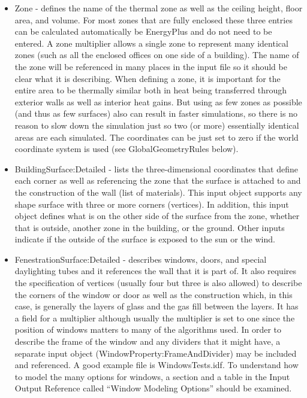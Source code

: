 \begin{itemize}
\item Zone - defines the name of the thermal zone as well as the ceiling
height, floor area, and volume. For most zones that are fully enclosed
these three entries can be calculated automatically be EnergyPlus
and do not need to be entered. A zone multiplier allows a single zone
to represent many identical zones (such as all the enclosed offices
on one side of a building). The name of the zone will be referenced
in many places in the input file so it should be clear what it is
describing. When defining a zone, it is important for the entire area
to be thermally similar both in heat being transferred through exterior
walls as well as interior heat gains. But using as few zones as possible
(and thus as few surfaces) also can result in faster simulations,
so there is no reason to slow down the simulation just so two (or
more) essentially identical areas are each simulated. The coordinates
can be just set to zero if the world coordinate system is used (see
GlobalGeometryRules below).
\item BuildingSurface:Detailed - lists the three-dimensional coordinates
that define each corner as well as referencing the zone that the surface
is attached to and the construction of the wall (list of materials).
This input object supports any shape surface with three or more corners
(vertices). In addition, this input object defines what is on the
other side of the surface from the zone, whether that is outside,
another zone in the building, or the ground. Other inputs indicate
if the outside of the surface is exposed to the sun or the wind. 
\item FenestrationSurface:Detailed - describes windows, doors, and special
daylighting tubes and it references the wall that it is part of. It
also requires the specification of vertices (usually four but three
is also allowed) to describe the corners of the window or door as
well as the construction which, in this case, is generally the layers
of glass and the gas fill between the layers. It has a field for a
multiplier although usually the multiplier is set to one since the
position of windows matters to many of the algorithms used. In order
to describe the frame of the window and any dividers that it might
have, a separate input object (WindowProperty:FrameAndDivider) may
be included and referenced. A good example file is WindowsTests.idf.
To understand how to model the many options for windows, a section
and a table in the Input Output Reference called ``Window Modeling
Options'' should be examined.
\end{itemize}

